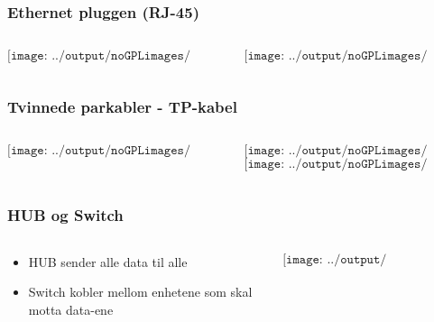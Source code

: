 \documentclass[aspectratio=169,xcolor=dvipsnames]{beamer}
\begin{document}
\begin{frame}
	\frametitle{Ethernet pluggen (RJ-45)}
	\begin{columns}
		\begin{column}{0.5\textwidth}

	$$\texttt{[image: ../output/noGPLimages/kap5x12]}$$
			
		\end{column}

		\begin{column}{0.5\textwidth}
	$$\texttt{[image: ../output/noGPLimages/kap5x13]}$$
		\end{column}
	\end{columns}
\end{frame}

\begin{frame}
	\frametitle{Tvinnede parkabler - TP-kabel}
	\begin{columns}
		\begin{column}{0.5\textwidth}

	$$\texttt{[image: ../output/noGPLimages/kap5x14]}$$

			
		\end{column}

		\begin{column}{0.5\textwidth}
	$$\texttt{[image: ../output/noGPLimages/kap5x15]}$$
	$$\texttt{[image: ../output/noGPLimages/kap5x16]}$$
		\end{column}
	\end{columns}
\end{frame}
\begin{frame}
	\frametitle{HUB og Switch}
	\begin{columns}
		\begin{column}{0.5\textwidth}

			\begin{itemize}
				\item HUB sender alle data til alle     
				\item Switch kobler mellom enhetene som skal motta data-ene
			\end{itemize}

			
		\end{column}

		\begin{column}{0.5\textwidth}
	$$\texttt{[image: ../output/noGPLimages/kap5x17]}$$
		\end{column}
	\end{columns}
\end{frame}
\end{document}
